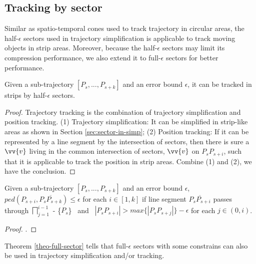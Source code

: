 \subsection{Tracking by sector}

Similar as spatio-temporal cones used to track trajectory in circular areas, the half-$\epsilon$ sectors used in trajectory simplification is applicable to track moving objects in strip areas. 
%
Moreover, because the half-$\epsilon$ sectors may limit its compression performance, we also extend it to full-$\epsilon$ sectors for better performance.



\begin{theorem}
	\label{theo-half-sector}
	Given a sub-trajectory $[P_s,...,P_{s+k}]$ and an error bound $\epsilon$, it can be tracked in strips by half-$\epsilon$ sectors.
\end{theorem}

\begin{proof}
	Trajectory tracking is the combination of trajectory simplification and position tracking.
	(1) Trajectory simplification: It can be simplified in strip-like areas as shown in Section \ref{sec:sector-in-simp};
	(2) Position tracking: If it can be represented by a line segment by the intersection of sectors, then there is sure a $\vv{v}$ living in the common intersection of sectors, \eg $\vv{v}$ on $P_sP_{s+i}$, such that it is applicable to track the position in strip areas.
	Combine (1) and (2), we have the conclusion.
\end{proof}



\begin{theorem}
	\label{theo-full-sector}
	Given a sub-trajectory $[P_s,...,P_{s+k}]$ and an error bound $\epsilon$, $ped(P_{s+i}, \overline{P_sP_{s+k}})\le \epsilon$ for each $i \in [1,k]$ if line segment $\overline{P_sP_{s+i}}$ passes through $\bigsqcap_{j=1}^{i-1}$ - \{$P_s$\} ~and~ $|P_sP_{s+i}| > max\{|P_sP_{s+j}|\} - \epsilon$ for each $j \in (0, i)$.
\end{theorem}

\begin{proof}
	\todo.
\end{proof}

Theorem \ref{theo-full-sector} tells that full-$\epsilon$ sectors with some constrains can also be used in trajectory simplification and/or tracking. 

